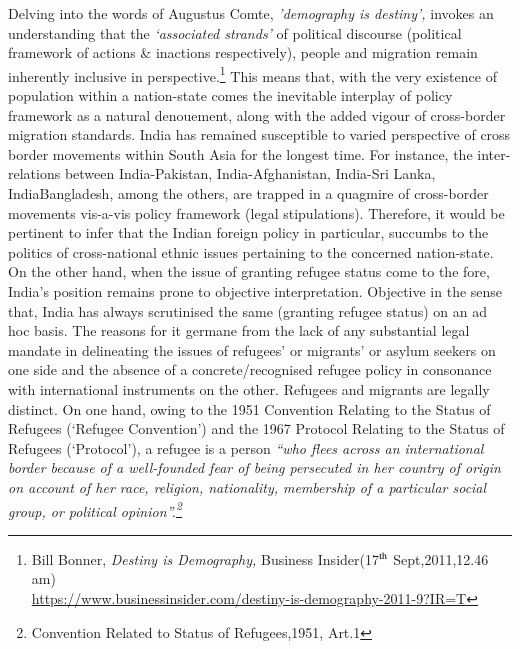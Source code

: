 \setcounter{figure}{0}
\setcounter{table}{0}


\begin{multicols}{2}


\vspace{-.2cm}

\noi
Delving into the words of Augustus Comte, \textit{'demography is destiny',} invokes an
understanding that the \textit{‘associated strands’} of political discourse (political framework of
actions \& inactions respectively), people and migration remain inherently inclusive in
perspective.\footnote{Bill Bonner, \textit{Destiny is Demography,} Business Insider(17$^{\rm th}$ Sept,2011,12.46 am)\\
\url{https://www.businessinsider.com/destiny-is-demography-2011-9?IR=T}}  This means that, with the very existence of population within a nation-state
comes the inevitable interplay of policy framework as a natural denouement, along with the
added vigour of cross-border migration standards. India has remained susceptible to varied
perspective of cross border movements within South Asia for the longest time. For instance,
the inter-relations between India-Pakistan, India-Afghanistan, India-Sri Lanka, IndiaBangladesh, among the others, are trapped in a quagmire of cross-border movements vis-a-vis
policy framework (legal stipulations). Therefore, it would be pertinent to infer that the Indian
foreign policy in particular, succumbs to the politics of cross-national ethnic issues pertaining
to the concerned nation-state. On the other hand, when the issue of granting refugee status
come to the fore, India’s position remains prone to objective interpretation. Objective in the
sense that, India has always scrutinised the same (granting refugee status) on an ad hoc basis.
The reasons for it germane from the lack of any substantial legal mandate in delineating the
issues of refugees’ or migrants’ or asylum seekers on one side and the absence of a
concrete/recognised refugee policy in consonance with international instruments on the other.
Refugees and migrants are legally distinct. On one hand, owing to the 1951 Convention
Relating to the Status of Refugees (‘Refugee Convention’) and the 1967 Protocol Relating to
the Status of Refugees (‘Protocol’), a refugee is a person \textit{“who flees across an international
border because of a well-founded fear of being persecuted in her country of origin on account
of her race, religion, nationality, membership of a particular social group, or political
opinion”.\footnote{Convention Related to Status of Refugees,1951, Art.1}}


\end{multicols}
